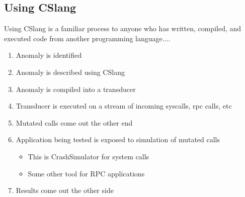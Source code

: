 \subsection{Using CSlang}

Using CSlang is a familiar process to anyone who has written, compiled, and
executed code from another programming language....

\begin{enumerate}
\item{Anomaly is identified}
\item{Anomaly is described using CSlang}
\item{Anomaly is compiled into a transducer}
\item{Transducer is executed on a stream of incoming syscalls, rpc calls, etc}
\item{Mutated calls come out the other end}
\item{Application being tested is exposed to simulation of mutated calls}
\begin{itemize}
\item{This is CrashSimulator for system calls}
\item{Some other tool for RPC applications}
\end{itemize}
\item{Results come out the other side}
\end{enumerate}
